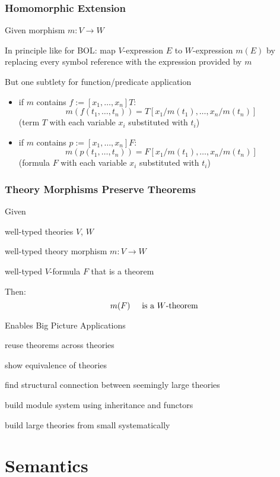 \begin{frame}\frametitle{Homomorphic Extension}
\begin{blockitems}{Given morphism $m:V\to W$}
\item In principle like for BOL: map $V$-expression $E$ to $W$-expression $m(E)$ by replacing every symbol reference with the expression provided by $m$
\item But one subtlety for function/predicate application
\begin{itemize}
 \item if $m$ contains $f:=[x_1,\ldots,x_n]T$:
   \[m(f(t_1,\ldots,t_n))=T[x_1/m(t_1),\ldots,x_n/m(t_n)]\]
  (term $T$ with each variable $x_i$ substituted with $t_i$)
 \item if $m$ contains $p:=[x_1,\ldots,x_n]F$:
   \[m(p(t_1,\ldots,t_n))=F[x_1/m(t_1),\ldots,x_n/m(t_n)]\]
  (formula $F$ with each variable $x_i$ substituted with $t_i$)
\end{itemize}
\end{blockitems}
\end{frame}

\begin{frame}\frametitle{Theory Morphisms Preserve Theorems}
\begin{blockitems}{Given}
\item well-typed theories $V$, $W$
\item well-typed theory morphism $m:V\to W$
\item well-typed $V$-formula $F$ that is a theorem 
\end{blockitems}

Then:
\[m(F) \hspace*{.5cm}\text{is a } W\text{-theorem}\]

\begin{blockitems}{Enables Big Picture Applications}
\item reuse theorems across theories
\item show equivalence of theories
\item find structural connection between seemingly large theories
\item build module system using inheritance and functors
\item build large theories from small systematically
\end{blockitems}
\end{frame}


\section{Semantics}

